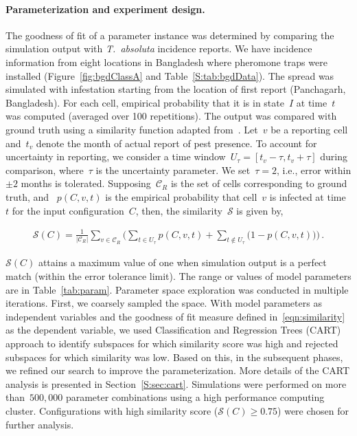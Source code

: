\documentclass[11pt]{article}
\newcommand{\tuta}{\emph{T.~absoluta}}
\newcommand{\reportingCells}{\mathcal{C}_R}
\newcommand{\similarity}{\mathcal{S}}
\theoremstyle{definition}
\begin{document}
\paragraph{Parameterization and experiment design.}
The goodness of fit of a parameter instance was determined by comparing the
simulation output with \tuta{} incidence reports. We have incidence
information from eight locations in Bangladesh where pheromone traps were
installed (Figure~\ref{fig:bgdClassA} and Table~\ref{S:tab:bgdData}). The
spread was simulated with infestation starting from the location of first
report (Panchagarh, Bangladesh). For each cell, empirical probability that
it is in state~$I$ at time~$t$ was computed (averaged over 100
repetitions). The output was compared with ground truth using a similarity
function adapted from~\cite{carrasco2010unveiling}.  Let~$v$ be a reporting
cell and~$t_v$ denote the month of actual report of pest presence.  To
account for uncertainty in reporting, we consider a time
window~$U_\tau=[t_v-\tau,t_v+\tau]$ during comparison, where~$\tau$ is the
uncertainty parameter. We set~$\tau=2$, i.e., error within $\pm2$ months is
tolerated.  Supposing~$\reportingCells$ is the set of cells corresponding
to ground truth,  and ~$p(C,v,t)$ is the empirical probability that cell~$v$
is infected at time~$t$ for the input configuration~$C$, then, the similarity~$\similarity$ is
given by,
\begin{linenomath}
\begin{align}\label{eqn:similarity}
    \similarity(C)=\frac{1}{|\reportingCells|}\sum_{v\in\reportingCells} \Big(\sum_{t\in U_\tau}p(C,v,t)
    + \sum_{t\notin U_\tau}\big(1-p(C,v,t)\big) \Big)\,.
\end{align}
\end{linenomath}
$\similarity(C)$ attains a maximum value of one when simulation output is a
perfect match (within the error tolerance limit).  The range or values of
model parameters are in Table~\ref{tab:param}.  Parameter space exploration
was conducted in multiple iterations.  First, we coarsely sampled the
space. With model parameters as independent variables and the goodness of
fit measure defined in~\eqref{eqn:similarity} as the dependent variable, we
used Classification and Regression Trees (CART) approach to identify
subspaces for which similarity score was high and rejected subspaces for
which similarity was low. Based on this, in the subsequent phases, we
refined our search to improve the parameterization.  More details of the
CART analysis is presented in Section~\ref{S:sec:cart}.  Simulations were
performed on more than~$500,000$ parameter combinations using a high
performance computing cluster. Configurations with high similarity score
($\similarity(C)\ge0.75$) were chosen for further analysis.
\end{document}

